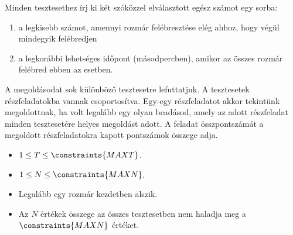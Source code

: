 Minden tesztesethez írj ki két szóközzel elválasztott egész számot egy sorba:
\begin{enumerate}
\item a legkisebb számot, amennyi rozmár felébresztése elég ahhoz, hogy végül mindegyik felébredjen
\item a legkorábbi lehetséges időpont (másodpercben), amikor az összes rozmár felébred ebben az esetben.
\end{enumerate}

\Scoring
A megoldásodat sok különböző tesztesetre lefuttatjuk. A tesztesetek részfeladatokba vannak csoportosítva. Egy-egy részfeladatot akkor tekintünk megoldottnak, ha volt legalább egy olyan beadásod, amely az adott részfeladat minden tesztesetére helyes megoldást adott.
A feladat összpontszámát a megoldott részfeladatokra kapott pontszámok összege adja.

\Constraints
\begin{itemize}[nolistsep, itemsep=2mm]
    \item $1 \le T \le \constraints{MAXT}$.
	\item $1 \le N \le \constraints{MAXN}$.
    \item Legalább egy rozmár kezdetben alszik.
    \item Az $N$ értékek összege az összes tesztesetben nem haladja meg a $\constraints{MAXN}$ értéket.
\end{itemize}






